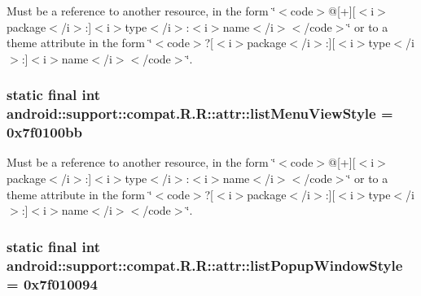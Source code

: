 Must be a reference to another resource, in the form \char`\"{}$<$code$>$@\mbox{[}+\mbox{]}\mbox{[}$<$i$>$package$<$/i$>$:\mbox{]}$<$i$>$type$<$/i$>$:$<$i$>$name$<$/i$>$$<$/code$>$\char`\"{} or to a theme attribute in the form \char`\"{}$<$code$>$?\mbox{[}$<$i$>$package$<$/i$>$:\mbox{]}\mbox{[}$<$i$>$type$<$/i$>$:\mbox{]}$<$i$>$name$<$/i$>$$<$/code$>$\char`\"{}. \hypertarget{classandroid_1_1support_1_1compat_1_1_r_1_1attr_f46f574e6de272b89dea0a2826224fce}{
\subsubsection[{listMenuViewStyle}]{\setlength{\rightskip}{0pt plus 5cm}static final int android::support::compat.R.R::attr::listMenuViewStyle = 0x7f0100bb}}
\label{classandroid_1_1support_1_1compat_1_1_r_1_1attr_f46f574e6de272b89dea0a2826224fce}


Must be a reference to another resource, in the form \char`\"{}$<$code$>$@\mbox{[}+\mbox{]}\mbox{[}$<$i$>$package$<$/i$>$:\mbox{]}$<$i$>$type$<$/i$>$:$<$i$>$name$<$/i$>$$<$/code$>$\char`\"{} or to a theme attribute in the form \char`\"{}$<$code$>$?\mbox{[}$<$i$>$package$<$/i$>$:\mbox{]}\mbox{[}$<$i$>$type$<$/i$>$:\mbox{]}$<$i$>$name$<$/i$>$$<$/code$>$\char`\"{}. \hypertarget{classandroid_1_1support_1_1compat_1_1_r_1_1attr_37f21b01dd86885a67c45f67d78ed934}{
\subsubsection[{listPopupWindowStyle}]{\setlength{\rightskip}{0pt plus 5cm}static final int android::support::compat.R.R::attr::listPopupWindowStyle = 0x7f010094}}
\label{classandroid_1_1support_1_1compat_1_1_r_1_1attr_37f21b01dd86885a67c45f67d78ed934}


